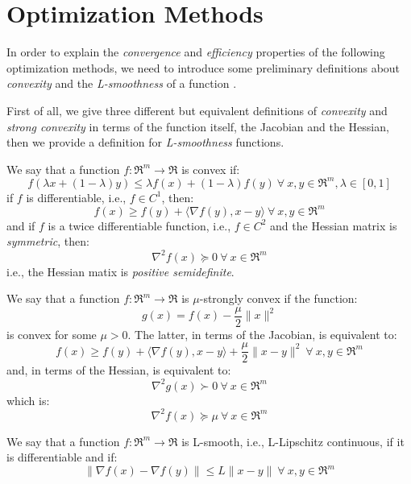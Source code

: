 \section{Optimization Methods}

In order to explain the \emph{convergence} and \emph{efficiency} properties of the following optimization methods, we need to introduce some preliminary definitions about \emph{convexity} and the \emph{L-smoothness} of a function \cite{boyd2004convex}.

First of all, we give three different but equivalent definitions of \emph{convexity} and \emph{strong convexity} in terms of the function itself, the Jacobian and the Hessian, then we provide a definition for \emph{L-smoothness} functions.

\begin{definition}[Convexity] \label{def:convexity}
We say that a function $f: \Re^m \rightarrow \Re$ is convex if:
$$ 
f(\lambda x + (1 - \lambda) y ) \leq \lambda f(x) + (1 - \lambda) f(y) \ \forall \ x, y \in \Re^m, \lambda \in [0,1]
$$
if $f$ is differentiable, i.e., $f \in C^1$, then:
$$
f(x) \geq f(y) + \langle \nabla f(y), x - y \rangle \ \forall \ x, y \in \Re^m
$$
and if $f$ is a twice differentiable function, i.e., $f \in C^2$ and the Hessian matrix is \emph{symmetric}, then:
$$
\nabla^2 f(x) \succeq 0 \ \forall \ x \in \Re^m
$$
i.e., the Hessian matix is \emph{positive semidefinite}.
\end{definition}

\begin{definition} \label{def:strong_convexity}
We say that a function $f: \Re^m \rightarrow \Re$ is $\mu$-strongly convex if the function:
$$
g(x) = f(x) - \frac{\mu}{2} \| x \|^2
$$
is convex for some $\mu > 0$. The latter, in terms of the Jacobian, is equivalent to:
$$
f(x) \geq f(y) + \langle \nabla f(y), x - y \rangle + \frac{\mu}{2} \| x - y \|^2 \ \forall \ x, y \in \Re^m
$$
and, in terms of the Hessian, is equivalent to:
$$
\nabla^2 g(x) \succ 0 \ \forall \ x \in \Re^m
$$
which is:
$$
\nabla^2 f(x) \succeq \mu \ \forall \ x \in \Re^m
$$
\end{definition}

\begin{definition}[L-smoothness] \label{def:l_smoothness}
We say that a function $f: \Re^m \rightarrow \Re$ is L-smooth, i.e., L-Lipschitz continuous, if it is differentiable and if:
$$
\| \nabla f(x) - \nabla f(y) \| \leq L \| x - y \| \ \forall \ x, y \in \Re^m
$$
\end{definition}

